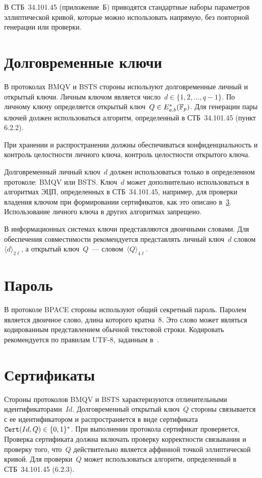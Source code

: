 В СТБ~34.101.45 (приложение~Б) приводятся стандартные 
наборы параметров эллиптической кривой, которые можно использовать 
напрямую, без повторной генерации или проверки.

\section{Долговременные ключи}\label{COMMON.Static}

В протоколах BMQV и BSTS стороны используют долговременные
личный и открытый ключи.
%
Личным ключом является число~$d\in\{1,2,\ldots,q-1\}$.
По личному ключу определяется открытый ключ~$Q\in E_{a,b}^*(\mathbb{F}_p)$.
Для генерации пары ключей должен использоваться алгоритм,
определенный в СТБ~34.101.45 (пункт 6.2.2).

При хранении и распространении
должны обеспечиваться конфиденциальность и контроль целостности личного 
ключа, контроль целостности открытого ключа.

Долговременный личный ключ~$d$ должен использоваться только 
в определенном протоколе: BMQV или BSTS. 
Ключ~$d$ может дополнительно использоваться в алгоритмах ЭЦП, 
определенных в СТБ~34.101.45, например,
для проверки владения ключом 
при формировании сертификатов, как это описано в~\ref{COMMON.Cert}. 
Использование личного ключа в других алгоритмах запрещено.

В информационных системах ключи представляются двоичными словами.
Для обеспечения совместимости рекомендуется представлять
личный ключ~$d$ словом~$\langle d\rangle_{2\ell}$,
а открытый ключ~$Q$~--- словом~$\langle Q\rangle_{4\ell}$.

\section{Пароль}\label{COMMON.Pwd}

В протоколе BPACE стороны используют общий секретный пароль.
%
Паролем является двоичное слово, 
длина которого кратна~$8$. Это слово может являться
кодированным представлением обычной текстовой строки. 
Кодировать рекомендуется по правилам UTF-8, 
заданным в~\cite{UTF8}.

\section{Сертификаты}\label{COMMON.Cert}

Стороны протоколов BMQV и BSTS характеризуются отличительными
идентификаторами~$Id$.
%
Долговременный открытый ключ~$Q$ стороны 
связывается с ее идентификатором и распространяется
в виде сертификата~$\texttt{Cert}(Id,Q)\in\{0,1\}^*$.
%
При выполнении протокола сертификат проверяется,
Проверка сертификата должна включать 
проверку корректности связывания
и проверку того, что~$Q$ действительно является аффинной
точкой эллиптической кривой. Для проверки~$Q$ может использоваться
алгоритм, определенный в СТБ~34.101.45 (6.2.3).

